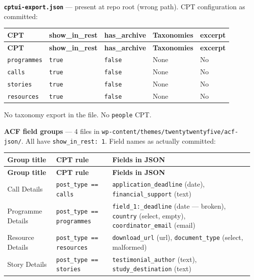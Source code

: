 \documentclass[12pt,a4paper]{article}
\begin{document}
\noindent\textbf{\texttt{cptui-export.json}} --- present at repo root (wrong path). CPT configuration as committed:

\vspace{0.4em}
\begin{longtable}{@{}p{3cm}p{2.5cm}p{2.5cm}p{3cm}p{1.8cm}@{}}
\toprule
\rowcolor{uvtLightBlue}
\textbf{CPT} & \textbf{show\_in\_rest} & \textbf{has\_archive} & \textbf{Taxonomies} & \textbf{excerpt} \\
\midrule
\endfirsthead
\toprule
\rowcolor{uvtLightBlue}
\textbf{CPT} & \textbf{show\_in\_rest} & \textbf{has\_archive} & \textbf{Taxonomies} & \textbf{excerpt} \\
\midrule
\endhead
\bottomrule
\endfoot
\texttt{programmes} & \texttt{true} & \textcolor{statusRed}{\texttt{false}} & \textcolor{statusRed}{None} & \textcolor{statusRed}{No} \\
\texttt{calls} & \texttt{true} & \textcolor{statusRed}{\texttt{false}} & \textcolor{statusRed}{None} & \textcolor{statusRed}{No} \\
\texttt{stories} & \texttt{true} & \textcolor{statusRed}{\texttt{false}} & \textcolor{statusRed}{None} & \textcolor{statusRed}{No} \\
\texttt{resources} & \texttt{true} & \textcolor{statusRed}{\texttt{false}} & \textcolor{statusRed}{None} & \textcolor{statusRed}{No} \\
\end{longtable}

No taxonomy export in the file. No \texttt{people} CPT.

\vspace{0.8em}
\noindent\textbf{ACF field groups} --- 4 files in \texttt{wp-content/themes/twentytwentyfive/acf-json/}. All have \texttt{show\_in\_rest: 1}. Field names as actually committed:

\vspace{0.4em}
\begin{longtable}{@{}p{3cm}p{3.5cm}p{5.8cm}@{}}
\toprule
\rowcolor{uvtLightBlue}
\textbf{Group title} & \textbf{CPT rule} & \textbf{Fields in JSON} \\
\midrule
\endfirsthead
\toprule
\rowcolor{uvtLightBlue}
\textbf{Group title} & \textbf{CPT rule} & \textbf{Fields in JSON} \\
\midrule
\endhead
\bottomrule
\endfoot
Call Details & \texttt{post\_type == calls} & \texttt{application\_deadline} (date), \texttt{financial\_support} (text) \\
Programme Details & \texttt{post\_type == programmes} & \texttt{field\_1:\_deadline} (date --- broken), \texttt{country} (select, empty), \texttt{coordinator\_email} (email) \\
Resource Details & \texttt{post\_type == resources} & \texttt{download\_url} (url), \texttt{document\_type} (select, malformed) \\
Story Details & \texttt{post\_type == stories} & \texttt{testimonial\_author} (text), \texttt{study\_destination} (text) \\
\end{longtable}
\end{document}
